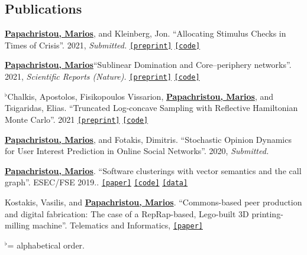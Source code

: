 \documentclass[margin, 10pt]{res}
\newcommand{\alphabeticalorder}[0]{\ensuremath  {^\flat}}
\newcommand{\specialurl}[2]{\href { #2 } {\nolinkurl{[#1]}}}
\newcommand{\preprint}[1]{\specialurl {preprint} {#1}}
\newcommand{\code}[1]{\specialurl {code} {#1}}
\newcommand{\data}[1]{\specialurl {data} {#1}}
\newcommand{\paper}[1]{\specialurl {paper} {#1}}
\newcommand{\authorref}[1]{\underline {\textbf{#1}}}
\newcommand{\authorme}{\authorref{Papachristou, Marios}}
\begin{document}
\begin{resume}
\section{Publications}

\begin{compactenum}
    
   \item  \authorme, and Kleinberg, Jon. ``Allocating Stimulus Checks in Times of Crisis''. 2021, \emph{Submitted.} \preprint{https://arxiv.org/abs/2106.07560} \code{https://github.com/papachristoumarios/financial-contagion}     
   \item \authorme ``Sublinear Domination and Core--periphery networks''. 2021,  \emph{Scientific Reports (Nature).}  \preprint{https://arxiv.org/abs/2103.03135} \code{https://bit.ly/3wKNGI0}
    \item \alphabeticalorder Chalkis, Apostolos, Fisikopoulos Vissarion, \authorme, and Tsigaridas, Elias. ``Truncated Log-concave Sampling with Reflective Hamiltonian Monte Carlo''. 2021 \preprint{https://arxiv.org/abs/2102.13068} \code{https://github.com/GeomScale/volume_approximation}
    \item \authorme, and Fotakis, Dimitris. ``Stochastic Opinion Dynamics for User Interest Prediction in Online Social Networks''. 2020, \emph{Submitted.}
    \item \authorme. ``Software clusterings with vector semantics and the call graph''. ESEC/FSE 2019.. \paper{https://dl.acm.org/citation.cfm?id=3342483} \code{https://github.com/papachristoumarios/sade} \data{http://doi.org/10.5281/zenodo.2652487}
    \item Kostakis, Vasilis, and \authorme. ``Commons-based peer production and digital fabrication: The case of a RepRap-based, Lego-built 3D printing-milling machine''. Telematics and Informatics,  \paper{https://bit.ly/2JRoisV} 
    
\end{compactenum}

\alphabeticalorder  = alphabetical order.

%
%
%


\end{resume}
\end{document}
